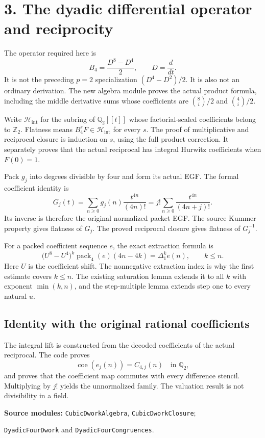 \documentclass[11pt]{article}
\newcommand{\Q}{\mathbb Q}\newcommand{\Z}{\mathbb Z}\newcommand{\N}{\mathbb N}
\newcommand{\code}[1]{\texttt{\small #1}}
\begin{document}
\newpage
\section*{3. The dyadic differential operator and reciprocity}
The operator required here is
\[
\boxed{B_4=\frac{D^8-D^4}{2},\qquad D=\frac{d}{dt}.}
\]
It is not the preceding $p=2$ specialization $(D^4-D^2)/2$. It is also not an ordinary derivation. The new algebra module proves the actual product formula, including the middle derivative sums whose coefficients are $\binom 8i/2$ and $\binom 4i/2$.

Write $\mathcal H_{\mathrm{int}}$ for the subring of $\Q_2[[t]]$ whose factorial-scaled coefficients belong to $\Z_2$. Flatness means $B_4^sF\in\mathcal H_{\mathrm{int}}$ for every $s$. The proof of multiplicative and reciprocal closure is induction on $s$, using the full product correction. It separately proves that the actual reciprocal has integral Hurwitz coefficients when $F(0)=1$.

Pack $g_j$ into degrees divisible by four and form its actual EGF. The formal coefficient identity is
\[
G_j(t)=\sum_{n\ge0}g_j(n)\frac{t^{4n}}{(4n)!}
       =j!\sum_{n\ge0}\frac{t^{4n}}{(4n+j)!}.
\]
Its inverse is therefore the original normalized packet EGF. The source Kummer property gives flatness of $G_j$. The proved reciprocal closure gives flatness of $G_j^{-1}$.

For a packed coefficient sequence $e$, the exact extraction formula is
\[
\bigl(U^8-U^4\bigr)^k\operatorname{pack}_4(e)(4n-4k)
 =\Delta_1^k e(n),\qquad k\le n.
\]
Here $U$ is the coefficient shift. The nonnegative extraction index is why the first estimate covers $k\le n$. The existing saturation lemma extends it to all $k$ with exponent $\min(k,n)$, and the step-multiple lemma extends step one to every natural $u$.

\subsection*{Identity with the original rational coefficients}
The integral lift is constructed from the decoded coefficients of the actual reciprocal. The code proves
\[
 \operatorname{coe}(e_j(n))=C_{4,j}(n)\quad\text{in }\Q_2,
\]
and proves that the coefficient map commutes with every difference stencil. Multiplying by $j!$ yields the unnormalized family. The valuation result is not divisibility in a field.

\textbf{Source modules:} \code{CubicDworkAlgebra}, \code{CubicDworkClosure};\par
\code{DyadicFourDwork} and \code{DyadicFourCongruences}.
\end{document}
